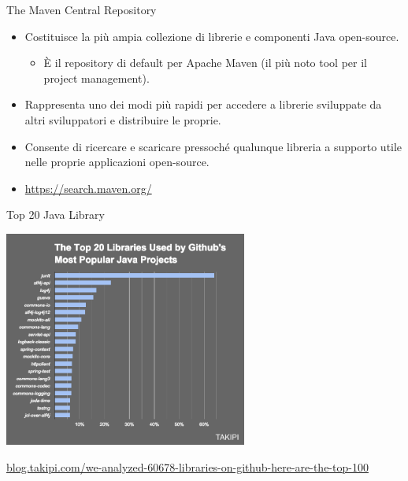 \documentclass[presentation]{beamer}
\begin{document}
\begin{frame}{The Maven Central Repository}
\begin{itemize}\itemsep10pt
\item Costituisce la più ampia collezione di librerie e componenti Java open-source.
\begin{itemize}
\item È il repository di default per Apache Maven (il più noto tool per il project management).
\end{itemize}
\item Rappresenta uno dei modi più rapidi per accedere a librerie sviluppate da altri sviluppatori e distribuire le proprie.
\item Consente di ricercare e scaricare pressoché qualunque libreria a supporto utile nelle proprie applicazioni open-source.

\item \url{https://search.maven.org/}
\end{itemize}
\end{frame}

\begin{frame}{Top 20 Java Library}
\begin{center}
\includegraphics[width=0.6\textwidth]{img/top-20-java-libraries}
\end{center}
{\scriptsize \url{blog.takipi.com/we-analyzed-60678-libraries-on-github-here-are-the-top-100}}
\end{frame}
\end{document}

